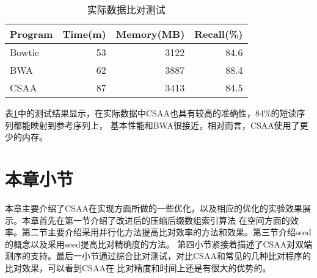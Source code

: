 \begin{table}[htbp]
    \caption{实际数据比对测试}
    \label{tab:tab3}
    \centering
    \begin{tabular}{lrrr}
       \toprule
       Program&Time(m)&Memory(MB)&Recall(\%)\\
       \midrule
       Bowtie&53&3122&84.6\\
       BWA&62&3887&88.4\\
       CSAA&87&3413&84.5\\
       \bottomrule
    \end{tabular}
\end{table}

表\ref{tab:tab3}中的测试结果显示，在实际数据中CSAA也具有较高的准确性，84\%的短读序列都能映射到参考序列上，
基本性能和BWA很接近，相对而言，CSAA使用了更少的内存。

\section{本章小节}

本章主要介绍了CSAA在实现方面所做的一些优化，以及相应的优化的实验效果展示。本章首先在第一节介绍了改进后的压缩后缀数组索引算法
在空间方面的效率。第二节主要介绍采用并行化方法提高比对效率的方法和效果。第三节介绍seed的概念以及采用seed提高比对精确度的方法。
第四小节紧接着描述了CSAA对双端测序的支持。最后一小节通过综合比对测试，对比CSAA和常见的几种比对程序的比对效果，可以看到CSAA在
比对精度和时间上还是有很大的优势的。
